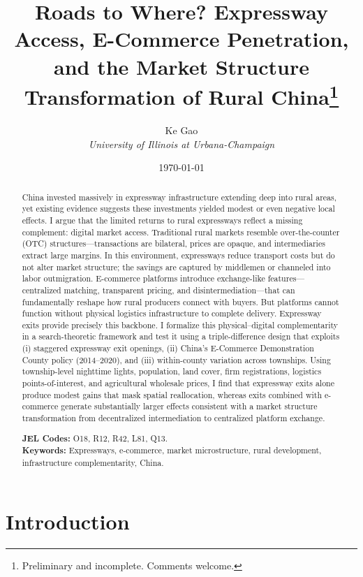 \documentclass[12pt]{article}
\title{\textbf{Roads to Where? Expressway Access, E-Commerce Penetration, and the Market Structure Transformation of Rural China}\thanks{Preliminary and incomplete. Comments welcome.}}
\author{Ke Gao\\[0.5em]\textit{University of Illinois at Urbana-Champaign}}
\date{\today}
\begin{document}
\maketitle

\begin{abstract}
\noindent
China invested massively in expressway infrastructure extending deep into rural areas, yet existing evidence suggests these investments yielded modest or even negative local effects. I argue that the limited returns to rural expressways reflect a missing complement: digital market access. Traditional rural markets resemble over-the-counter (OTC) structures---transactions are bilateral, prices are opaque, and intermediaries extract large margins. In this environment, expressways reduce transport costs but do not alter market structure; the savings are captured by middlemen or channeled into labor outmigration. E-commerce platforms introduce exchange-like features---centralized matching, transparent pricing, and disintermediation---that can fundamentally reshape how rural producers connect with buyers. But platforms cannot function without physical logistics infrastructure to complete delivery. Expressway exits provide precisely this backbone. I formalize this physical--digital complementarity in a search-theoretic framework and test it using a triple-difference design that exploits (i) staggered expressway exit openings, (ii) China's E-Commerce Demonstration County policy (2014--2020), and (iii) within-county variation across townships. Using township-level nighttime lights, population, land cover, firm registrations, logistics points-of-interest, and agricultural wholesale prices, I find that expressway exits alone produce modest gains that mask spatial reallocation, whereas exits combined with e-commerce generate substantially larger effects consistent with a market structure transformation from decentralized intermediation to centralized platform exchange.

\bigskip
\noindent\textbf{JEL Codes:} O18, R12, R42, L81, Q13.\\
\textbf{Keywords:} Expressways, e-commerce, market microstructure, rural development, infrastructure complementarity, China.
\end{abstract}

\clearpage
\tableofcontents
\clearpage

\section{Introduction}
\end{document}
